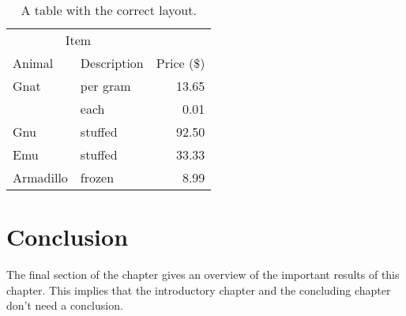 \begin{table}
  \centering
  \begin{tabular}{@{}llr@{}} \toprule
    \multicolumn{2}{c}{Item} \\ \cmidrule(r){1-2}
    Animal    & Description & Price (\$)\\ \midrule
    Gnat      & per gram    & 13.65 \\
              & each        & 0.01 \\
    Gnu       & stuffed     & 92.50 \\
    Emu       & stuffed     & 33.33 \\
    Armadillo & frozen      & 8.99 \\ \bottomrule
  \end{tabular}
  \caption{A table with the correct layout.}
  \label{tab:ok}
\end{table}


\section{Conclusion}
The final section of the chapter gives an overview of the important results
of this chapter. This implies that the introductory chapter and the
concluding chapter don't need a conclusion.



